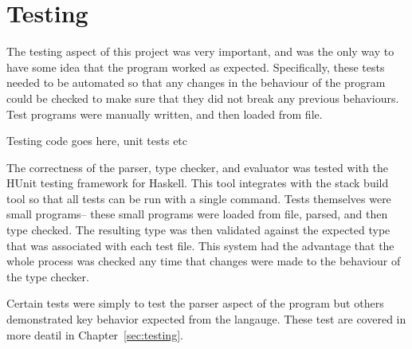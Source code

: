 \section{Testing}
The testing aspect of this project was very important, and was the only way to
have some idea that the program worked as expected. Specifically, these tests
needed to be automated so that any changes in the behaviour of the program could
be checked to make sure that they did not break any previous behaviours. Test
programs were manually written, and then loaded from file.

Testing code goes here, unit tests etc

The correctness of the parser, type checker, and evaluator was tested with the
HUnit testing framework for Haskell. This tool integrates with the stack build
tool so that all tests can be run with a single command. Tests themselves were
small programs-- these small programs were loaded from file, parsed, and then
type checked. The resulting type was then validated against the expected type
that was associated with each test file. This system had the advantage that
the whole process was checked any time that changes were made to the behaviour
of the type checker.

Certain tests were simply to test the parser aspect of the program but others
demonstrated key behavior expected from the langauge. These test are covered in
more deatil in Chapter~\ref{sec:testing}.

